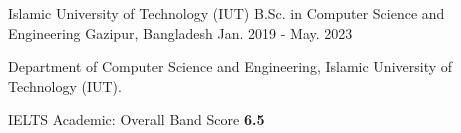 

\begin{cventries}

  \cventry
    {Islamic University of Technology (IUT)} %
    {B.Sc. in Computer Science and Engineering} %
    {Gazipur, Bangladesh} %
    {Jan. 2019 - May. 2023} %
    {
      \begin{cvitems} %
        \item {Department of Computer Science and Engineering, Islamic University of Technology (IUT).}
        \item {IELTS Academic: Overall Band Score \textbf{6.5}}
      \end{cvitems}
    }



\end{cventries}
